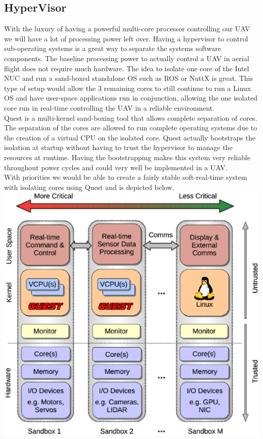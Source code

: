 \documentclass[letterpaper,10pt,notitlepage,fleqn]{article}
\begin{document}
\subsection{HyperVisor}
\indent With the luxury of having a powerful multi-core processor controlling our UAV we will have a lot of processing power left over. Having a hypervisor to control sub-operating systems is a great way to separate the systems software components. The baseline processing power to actually control a UAV in aerial flight does not require much hardware. The idea to isolate one core of the Intel NUC and run a sand-boxed standalone OS such as ROS or NuttX is great. This type of setup
would allow the 3 remaining cores to still continue to run a Linux OS and have user-space applications run in conjunction, allowing the one isolated core run in real-time controlling the UAV in a reliable environment.
\\
\indent Quest is a multi-kernel sand-boxing tool that allows complete separation of cores. The separation of the cores are allowed to run complete operating systems due to the creation of a virtual CPU on the isolated core. Quest actually bootstraps the isolation at startup without having to trust the hypervisor to manage the resources at runtime. Having the bootstrapping makes this system very reliable throughout power cycles and could very well be implemented in a UAV. 
\\ 
\indent With priorities we would be able to create a fairly stable soft-real-time system with isolating cores using Quest and is depicted below. \\
\includegraphics[scale=.5]{quest-v-overview.eps} \\
\end{document}
